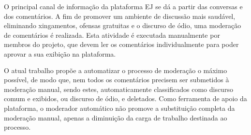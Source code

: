 O principal canal de informação da plataforma EJ se dá a partir das conversas e dos comentários. A fim de promover um ambiente de discussão mais saudável, eliminando xingamentos, ofensas gratuitas e o discurso de ódio, uma moderação de comentários é realizada. Esta atividade é executada manualmente por membros do projeto, que devem ler os comentários individualmente para poder aprovar a sua exibição na plataforma.

O atual trabalho propõe a automatizar o processo de moderação o máximo possível, de modo que, nem todos os comentários precisem ser submetidos à moderação manual, sendo estes, automaticamente classificados como discurso comum e exibidos, ou discurso de ódio, e deletados. Como ferramenta de apoio da plataforma, o moderador automático não promove a substituição completa da moderação manual, apenas a diminuição da carga de trabalho destinada ao processo.